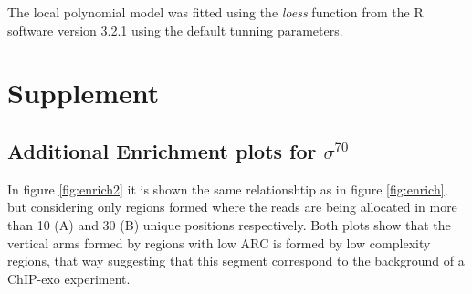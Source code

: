 \documentclass{bmcart}\usepackage[]{graphicx}\usepackage[]{color}
\begin{document}
The local polynomial model was fitted using the \emph{loess} function
from the R software version 3.2.1 using the default tunning parameters.


\newpage



\nocite{exo_gb}
\nocite{maplot1}
\nocite{maplot2}


\newpage

\section*{Supplement}
\label{sec:supp}


\subsection*{Additional Enrichment plots for $\sigma^{70}$}
\label{sec:enrichsup}

In figure \ref{fig:enrich2} it is shown the same relationshtip as in
figure \ref{fig:enrich}, but considering only regions formed where the
reads are being allocated in more than 10 (A) and 30 (B) unique
positions respectively. Both plots show that the vertical arms formed
by regions with low $\mbox{ARC}$ is formed by low complexity regions,
that way suggesting that this segment correspond to the background of
a ChIP-exo experiment.
\end{document}
